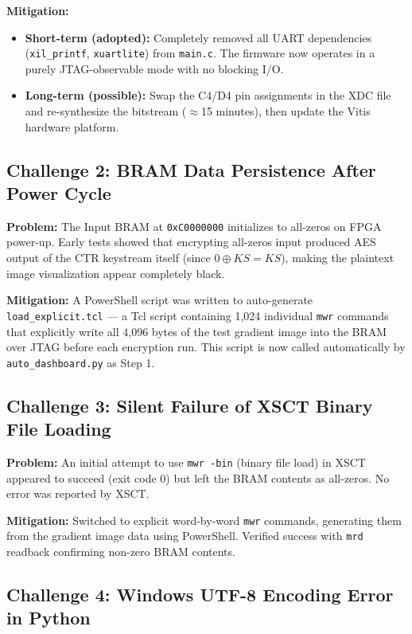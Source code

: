\documentclass[12pt,a4paper]{article}
\begin{document}
\textbf{Mitigation:}
\begin{itemize}[leftmargin=*]
    \item \textbf{Short-term (adopted):} Completely removed all UART dependencies (\texttt{xil\_printf}, \texttt{xuartlite}) from \texttt{main.c}. The firmware now operates in a purely JTAG-observable mode with no blocking I/O.
    \item \textbf{Long-term (possible):} Swap the C4/D4 pin assignments in the XDC file and re-synthesize the bitstream ($\approx$15 minutes), then update the Vitis hardware platform.
\end{itemize}

\subsection{Challenge 2: BRAM Data Persistence After Power Cycle}

\textbf{Problem:} The Input BRAM at \texttt{0xC0000000} initializes to all-zeros on FPGA power-up. Early tests showed that encrypting all-zeros input produced AES output of the CTR keystream itself (since $0 \oplus KS = KS$), making the plaintext image visualization appear completely black.

\textbf{Mitigation:} A PowerShell script was written to auto-generate \texttt{load\_explicit.tcl} --- a Tcl script containing 1,024 individual \texttt{mwr} commands that explicitly write all 4,096 bytes of the test gradient image into the BRAM over JTAG before each encryption run. This script is now called automatically by \texttt{auto\_dashboard.py} as Step 1.

\subsection{Challenge 3: Silent Failure of XSCT Binary File Loading}

\textbf{Problem:} An initial attempt to use \texttt{mwr -bin} (binary file load) in XSCT appeared to succeed (exit code 0) but left the BRAM contents as all-zeros. No error was reported by XSCT.

\textbf{Mitigation:} Switched to explicit word-by-word \texttt{mwr} commands, generating them from the gradient image data using PowerShell. Verified success with \texttt{mrd} readback confirming non-zero BRAM contents.

\subsection{Challenge 4: Windows UTF-8 Encoding Error in Python}
\end{document}
